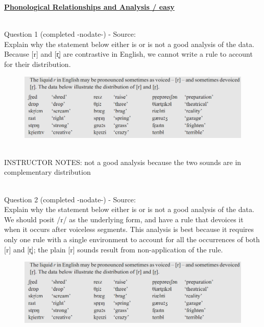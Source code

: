 \documentclass[12pt]{article}
\begin{document}
\newpage\textbf{\underline{\huge Phonological Relationships and Analysis / easy\\}}

~\\

{\large Question 1} (completed -nodate-) - Source: \\

Explain why the statement below either is or is not a good analysis of the data.\\

Because {[r]} and {[r̥]} are contrastive in English, we cannot write a rule to account for their distribution.

\begin{figure}[H]
\includegraphics{../images/peng71_englishr.png}
\end{figure}

~\\
INSTRUCTOR NOTES: not a good analysis because the two sounds are in complementary distribution


~\\

{\large Question 2} (completed -nodate-) - Source: \\

Explain why the statement below either is or is not a good analysis of the data.\\

We should posit /r/ as the underlying form, and have a rule that devoices it when it occurs after voiceless segments. This analysis is best because it requires only one rule with a single environment to account for all the occurrences of both {[r]} and {[r̥]}; the plain {[r]} sounds result from non-application of the rule.

\begin{figure}[H]
\includegraphics{../images/peng71_englishr.png}
\end{figure}
\end{document}

